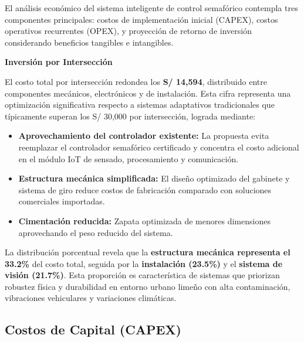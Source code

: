 \documentclass[12pt,a4paper,oneside]{report}
\begin{document}
El análisis económico del sistema inteligente de control semafórico contempla tres componentes principales: costos de implementación inicial (CAPEX), costos operativos recurrentes (OPEX), y proyección de retorno de inversión considerando beneficios tangibles e intangibles.

\textbf{Inversión por Intersección}

El costo total por intersección redondea los \textbf{S/ 14,594}, distribuido entre componentes mecánicos, electrónicos y de instalación. Esta cifra representa una optimización significativa respecto a sistemas adaptativos tradicionales que típicamente superan los S/ 30,000 por intersección, lograda mediante:

\begin{itemize}
\item
  \textbf{Aprovechamiento del controlador existente:} La propuesta evita reemplazar el controlador semafórico certificado y concentra el costo adicional en el módulo IoT de sensado, procesamiento y comunicación.
\end{itemize}

\begin{itemize}
\item
  \textbf{Estructura mecánica simplificada:} El diseño optimizado del gabinete y sistema de giro reduce costos de fabricación comparado con soluciones comerciales importadas.
\end{itemize}

\begin{itemize}
\item
  \textbf{Cimentación reducida:} Zapata optimizada de menores dimensiones aprovechando el peso reducido del sistema.
\end{itemize}

La distribución porcentual revela que la \textbf{estructura mecánica representa el 33.2\%} del costo total, seguida por la \textbf{instalación (23.5\%)} y el \textbf{sistema de visión (21.7\%)}. Esta proporción es característica de sistemas que priorizan robustez física y durabilidad en entorno urbano limeño con alta contaminación, vibraciones vehiculares y variaciones climáticas.

\subsection{Costos de Capital (CAPEX)}\label{costos-de-capital-capex}

\label{tbl:7.1}
\end{document}

